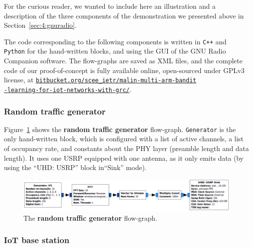 For the curious reader, we wanted to include here an illustration and a description of the three components of the demonstration we presented above in Section~\ref{sec:4:gnuradio}.

The code corresponding to the following components is written in \texttt{C++} and \texttt{Python} for the hand-written blocks, and using the GUI of the GNU Radio Companion software.
The flow-graphs are saved as XML files, and the complete code of our proof-of-concept is fully available online, open-sourced under GPLv3 license, at
\href{https://bitbucket.org/scee_ietr/malin-multi-arm-bandit-learning-for-iot-networks-with-grc}{\texttt{bitbucket.org/scee\_ietr/malin-multi-arm-bandit}\\\texttt{-learning-for-iot-networks-with-grc/}}.

\subsubsection*{Random traffic generator}

Figure~\ref{fig:4app:USRP_TX_PU__v1__simple_grc} shows the \textbf{random traffic generator} flow-graph.
\texttt{Generator} is the only hand-written block, which is configured with a list of active channels, a list of occupancy rate, and constants about the PHY layer (preamble length and data length).
It uses one USRP equipped with one antenna, as it only emits data (by using the ``UHD: USRP'' block in``Sink'' mode).

\begin{figure}[!h]
    \includegraphics[width=1.02\textwidth]{2-Chapters/4-Chapter/Images/USRP_TX_PU__v1__simple_grc.png}
    \caption{The \textbf{random traffic generator} flow-graph.}
    \label{fig:4app:USRP_TX_PU__v1__simple_grc}
\end{figure}


\subsubsection*{IoT base station}


